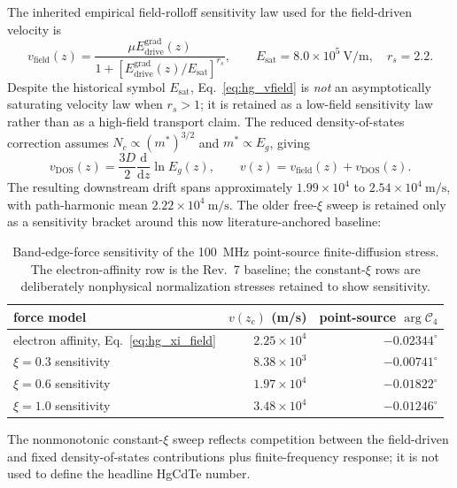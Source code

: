 \documentclass[11pt]{article}
\newcommand{\dd}{\mathrm{d}}
\begin{document}
The inherited empirical field-rolloff sensitivity law used for the field-driven velocity is
\begin{equation}
v_{\mathrm{field}}(z)=\frac{\mu E_{\mathrm{drive}}^{\mathrm{grad}}(z)}{1+[E_{\mathrm{drive}}^{\mathrm{grad}}(z)/E_{\mathrm{sat}}]^{r_s}},
\qquad E_{\mathrm{sat}}=8.0\times10^5~\mathrm{V/m},\quad r_s=2.2.
\label{eq:hg_vfield}
\end{equation}
Despite the historical symbol $E_{\mathrm{sat}}$, Eq.~\eqref{eq:hg_vfield} is \emph{not} an asymptotically saturating velocity law when $r_s>1$; it is retained as a low-field sensitivity law rather than as a high-field transport claim. The reduced density-of-states correction assumes $N_c\propto(m^*)^{3/2}$ and $m^*\propto E_g$, giving
\begin{equation}
\boxed{v_{\mathrm{DOS}}(z)=\frac{3D}{2}\frac{\dd}{\dd z}\ln E_g(z),\qquad v(z)=v_{\mathrm{field}}(z)+v_{\mathrm{DOS}}(z).}
\label{eq:hg_velocity}
\end{equation}
The resulting downstream drift spans approximately $1.99\times10^4$ to $2.54\times10^4~\mathrm{m/s}$, with path-harmonic mean $2.22\times10^4~\mathrm{m/s}$. The older free-$\xi$ sweep is retained only as a sensitivity bracket around this now literature-anchored baseline:
\begin{table}[H]
\centering
\caption{Band-edge-force sensitivity of the \SI{100}{MHz} point-source finite-diffusion stress. The electron-affinity row is the Rev.~7 baseline; the constant-$\xi$ rows are deliberately nonphysical normalization stresses retained to show sensitivity.}
\label{tab:hg_xi_sweep}
\begin{tabular}{lrr}
\toprule
force model & $v(z_c)$ (m/s) & point-source $\arg\mathcal C_4$ \\
\midrule
electron affinity, Eq.~\eqref{eq:hg_xi_field} & $2.25\times10^4$ & $-0.02344^\circ$ \\
$\xi=0.3$ sensitivity & $8.38\times10^3$ & $-0.00741^\circ$ \\
$\xi=0.6$ sensitivity & $1.97\times10^4$ & $-0.01822^\circ$ \\
$\xi=1.0$ sensitivity & $3.48\times10^4$ & $-0.01246^\circ$ \\
\bottomrule
\end{tabular}
\end{table}
The nonmonotonic constant-$\xi$ sweep reflects competition between the field-driven and fixed density-of-states contributions plus finite-frequency response; it is not used to define the headline HgCdTe number.
\end{document}
